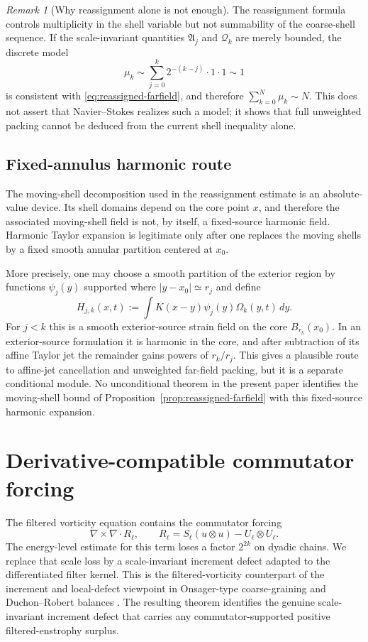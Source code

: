 \documentclass[11pt]{article}
\numberwithin{equation}{section}
\theoremstyle{plain}
\theoremstyle{definition}
\theoremstyle{remark}
\newtheorem{remark}[theorem]{Remark}
\begin{document}
\begin{remark}[Why reassignment alone is not enough]\label{rem:unweighted-not-from-energy}
The reassignment formula controls multiplicity in the shell variable but not summability of the coarse-shell sequence.  If the scale-invariant quantities $\mathfrak A_j$ and $\mathcal Q_k$ are merely bounded, the discrete model
\[
\mu_k\sim \sum_{j=0}^{k}2^{-(k-j)}\cdot 1\cdot 1\sim1
\]
is consistent with \eqref{eq:reassigned-farfield}, and therefore $\sum_{k=0}^N\mu_k\sim N$.  This does not assert that Navier--Stokes realizes such a model; it shows that full unweighted packing cannot be deduced from the current shell inequality alone.
\end{remark}


\subsection{Fixed-annulus harmonic route}\label{rem:fixed-annulus-harmonic-route}

The moving-shell decomposition used in the reassignment estimate is an absolute-value device.  Its shell domains depend on the core point $x$, and therefore the associated moving-shell field is not, by itself, a fixed-source harmonic field.  Harmonic Taylor expansion is legitimate only after one replaces the moving shells by a fixed smooth annular partition centered at $x_0$.

More precisely, one may choose a smooth partition of the exterior region by functions $\psi_j(y)$ supported where $|y-x_0|\simeq r_j$ and define
\[
H_{j,k}(x,t):=\int K(x-y)\psi_j(y)\Omega_k(y,t)\,dy.
\]
For $j<k$ this is a smooth exterior-source strain field on the core $B_{r_k}(x_0)$.  In an exterior-source formulation it is harmonic in the core, and after subtraction of its affine Taylor jet the remainder gains powers of $r_k/r_j$.  This gives a plausible route to affine-jet cancellation and unweighted far-field packing, but it is a separate conditional module.  No unconditional theorem in the present paper identifies the moving-shell bound of Proposition~\ref{prop:reassigned-farfield} with this fixed-source harmonic expansion.

\section{Derivative-compatible commutator forcing}\label{sec:comm}

The filtered vorticity equation contains the commutator forcing
\[
\nabla\times\nabla\!\cdot R_{\ell},
\qquad
R_\ell=S_\ell(u\otimes u)-U_\ell\otimes U_\ell.
\]
The energy-level estimate for this term loses a factor $2^{2k}$ on dyadic chains.  We replace that scale loss by a scale-invariant increment defect adapted to the differentiated filter kernel.  This is the filtered-vorticity counterpart of the increment and local-defect viewpoint in Onsager-type coarse-graining and Duchon--Robert balances \cite{ConstantinETiti1994,DuchonRobert2000,EyinkAluie2009}.  The resulting theorem identifies the genuine scale-invariant increment defect that carries any commutator-supported positive filtered-enstrophy surplus.
\end{document}
